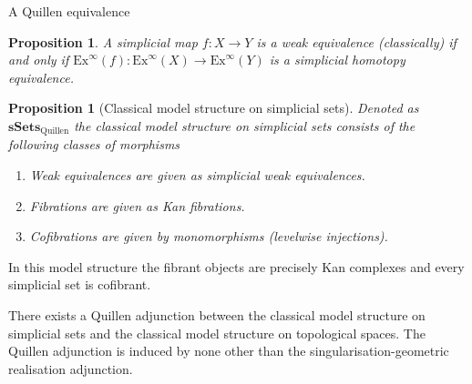 \documentclass[10pt]{beamer}
\newcounter{dummy} \numberwithin{dummy}{section}
\newtheorem{proposition}[dummy]{Proposition}
\begin{document}
\begin{frame}{A Quillen equivalence}
	\begin{proposition}
		A simplicial map \( f:X\to Y \) is a weak equivalence (classically) if and only if \( \mathrm{Ex}^\infty (f): \mathrm{Ex}^\infty (X) \to \mathrm{Ex}^\infty (Y)\) is a simplicial homotopy equivalence.
	\end{proposition}
	
	\begin{proposition}[Classical model structure on simplicial sets]
		Denoted as \( \mathbf{sSets}_\mathrm{Quillen} \) the classical model structure on simplicial sets consists of the following classes of morphisms
		\begin{enumerate}
			\item Weak equivalences are given as simplicial weak equivalences.
			\item Fibrations are given as Kan fibrations.
			\item Cofibrations are given by monomorphisms (levelwise injections).
		\end{enumerate}
	\end{proposition}
	
	In this model structure the fibrant objects are precisely Kan complexes and every simplicial set is cofibrant. 
	
	There exists a Quillen adjunction between the classical model structure on simplicial sets and the classical model structure on topological spaces. The Quillen adjunction is induced by none other than the singularisation-geometric realisation adjunction.
\end{frame}
\end{document}
